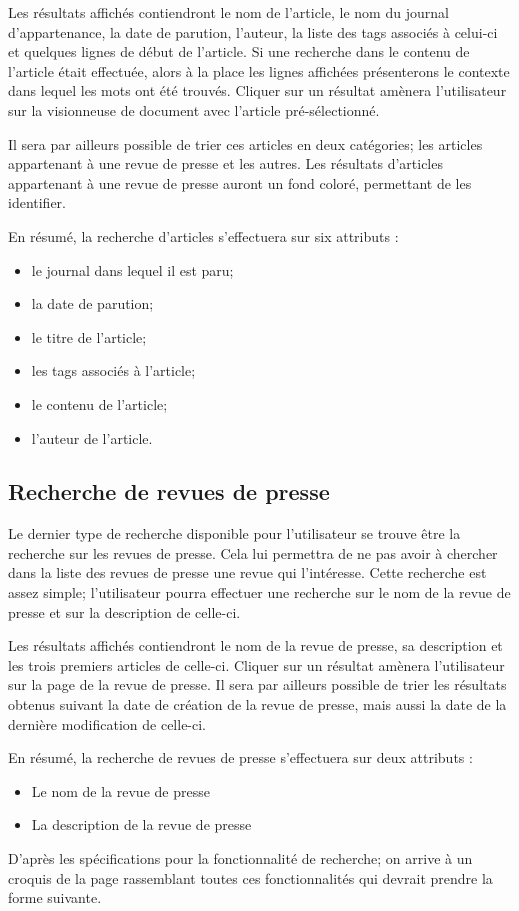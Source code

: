 Les résultats affichés contiendront le nom de l'article, le nom du journal d'appartenance, la date de parution, l'auteur, la liste des tags associés à celui-ci et quelques lignes de début de l'article. Si une recherche dans le contenu de l'article était effectuée, alors à la place les lignes affichées présenterons le contexte dans lequel les mots ont été trouvés. Cliquer sur un résultat amènera l'utilisateur sur la visionneuse de document avec l'article pré-sélectionné.

Il sera par ailleurs possible de trier ces articles en deux catégories; les articles appartenant à une revue de presse et les autres. Les résultats d'articles appartenant à une revue de presse auront un fond coloré, permettant de les identifier.

En résumé, la recherche d'articles s'effectuera sur six attributs :
\begin{itemize}
	\item le journal dans lequel il est paru;
	\item la date de parution;
	\item le titre de l'article;
	\item les tags associés à l'article;
	\item le contenu de l'article;
	\item l'auteur de l'article.
\end{itemize}

\subsection{Recherche de revues de presse}
\label{sec:recherche_revue}

Le dernier type de recherche disponible pour l'utilisateur se trouve être la recherche sur les revues de presse. Cela lui permettra de ne pas avoir à chercher dans la liste des revues de presse une revue qui l'intéresse. Cette recherche est assez simple; l'utilisateur pourra effectuer une recherche sur le nom de la revue de presse et sur la description de celle-ci.

Les résultats affichés contiendront le nom de la revue de presse, sa description et les trois premiers articles de celle-ci. Cliquer sur un résultat amènera l'utilisateur sur la page de la revue de presse. Il sera par ailleurs possible de trier les résultats obtenus suivant la date de création de la revue de presse, mais aussi la date de la dernière modification de celle-ci.

En résumé, la recherche de revues de presse s'effectuera sur deux attributs :
\begin{itemize}
	\item Le nom de la revue de presse
	\item La description de la revue de presse
\end{itemize}
\bigskip
\par
D'après les spécifications pour la fonctionnalité de recherche; on arrive à un croquis de la page rassemblant toutes ces fonctionnalités qui devrait prendre la forme suivante.

